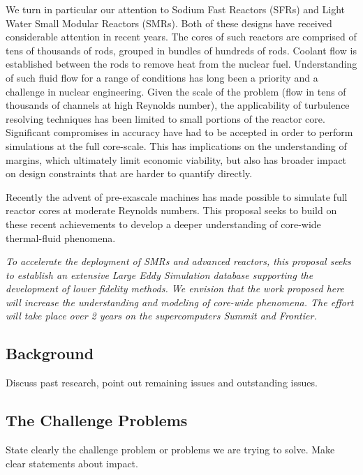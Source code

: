 \documentclass[11pt,letterpaper,english]{article}
\begin{document}
We turn in particular our attention to Sodium Fast Reactors (SFRs) and Light Water Small Modular Reactors (SMRs). Both of these designs have received considerable attention in recent years. The cores of such reactors are comprised of tens of thousands of rods, grouped in bundles of hundreds of rods. Coolant flow is established between the rods to remove heat from the nuclear fuel. Understanding of such fluid flow for a range of conditions has long been a priority and a challenge in nuclear engineering. Given the scale of the problem (flow in tens of thousands of channels at high Reynolds number), the applicability of turbulence resolving techniques has been limited to small portions of the reactor core. Significant compromises in accuracy have had to be accepted in order to perform simulations at the full core-scale. This has implications on the understanding of margins, which ultimately limit economic viability, but also has broader impact on design constraints that are harder to quantify directly.

Recently the advent of pre-exascale machines has made possible to simulate full reactor cores at moderate Reynolds numbers. This proposal seeks to build on these recent achievements to develop a deeper understanding of core-wide thermal-fluid phenomena.

\textit{To accelerate the deployment of SMRs and advanced reactors, this proposal seeks to establish an extensive  Large Eddy Simulation database supporting the development of lower fidelity methods. We envision that the work proposed here will increase the understanding and modeling of core-wide phenomena. The effort will take place over 2 years on the supercomputers Summit and Frontier.}

\vspace{-.25in}
\subsection{Background}
\vspace{-.2in}

Discuss past research, point out remaining issues and outstanding issues.

\vspace{-.25in}
\subsection{The Challenge Problems}
\vspace{-.2in}

State clearly the challenge problem or problems we are trying to solve.
Make clear statements about impact.
\end{document}
